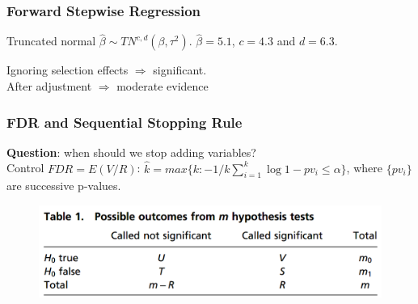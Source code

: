 \documentclass{beamer}
\begin{document}
\begin{frame}
\frametitle{Forward Stepwise Regression}
Truncated normal $\hat{\beta}\sim TN^{c,d}(\beta, \tau^2)$. $\hat{\beta}= 5.1$, $c = 4.3$ and $d = 6.3$.
\begin{figure}
\end{figure}
Ignoring selection effects $\Rightarrow$ significant.\\
After adjustment $\Rightarrow$ moderate evidence
\end{frame}

\begin{frame}
\frametitle{FDR and Sequential Stopping Rule}
\textbf{Question}: when should we stop adding variables?\\
Control $FDR = E(V/R)$: $\hat{k} = max\{k: -1/k\sum_{i=1}^{k}{\log{1-pv_i}}\leq\alpha\}$, where $\{pv_i\}$ are successive p-values.
\begin{figure}
	\includegraphics[width=0.6\linewidth]{stepwise_FDR.png}
\end{figure}
\end{frame}
\end{document}
